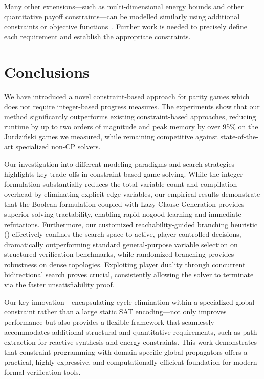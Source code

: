 \documentclass[a4paper,fleqn]{cas-sc}
\begin{document}
Many other extensions---such as multi-dimensional energy bounds and other quantitative payoff constraints---can be modelled similarly using additional constraints or objective functions~\citep{bozzelly:2020,Fijalkow:2014,Mogavero:2015,Weinert:2016}. Further work is needed to precisely define each requirement and establish the appropriate constraints.

\section{Conclusions}
We have introduced a novel constraint-based approach for parity games which does not require integer-based progress measures. The experiments show that our method significantly outperforms existing constraint-based approaches, reducing runtime by up to two orders of magnitude and peak memory by over 95\% on the Jurdziński games we measured, while remaining competitive against state-of-the-art specialized non-CP solvers. 

Our investigation into different modeling paradigms and search strategies highlights key trade-offs in constraint-based game solving. While the integer formulation substantially reduces the total variable count and compilation overhead by eliminating explicit edge variables, our empirical results demonstrate that the Boolean formulation coupled with Lazy Clause Generation provides superior solving tractability, enabling rapid nogood learning and immediate refutations. Furthermore, our customized reachability-guided branching heuristic (\nocbrancher) effectively confines the search space to active, player-controlled decisions, dramatically outperforming standard general-purpose variable selection on structured verification benchmarks, while randomized branching provides robustness on dense topologies. Exploiting player duality through concurrent bidirectional search proves crucial, consistently allowing the solver to terminate via the faster unsatisfiability proof.

Our key innovation—encapsulating cycle elimination within a specialized global constraint rather than a large static SAT encoding—not only improves performance but also provides a flexible framework that seamlessly accommodates additional structural and quantitative requirements, such as path extraction for reactive synthesis and energy constraints. This work demonstrates that constraint programming with domain-specific global propagators offers a practical, highly expressive, and computationally efficient foundation for modern formal verification tools.

\printcredits

\newpage

% 





\end{document}
